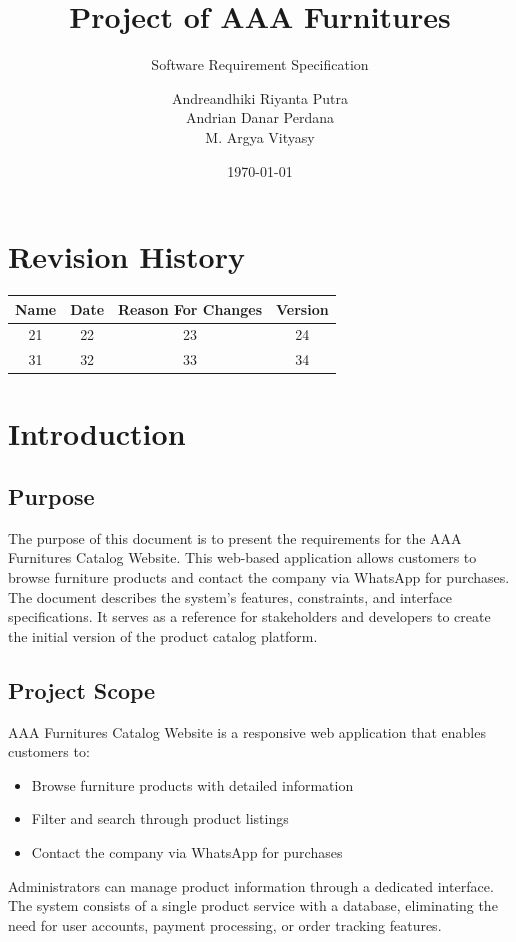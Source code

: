 \documentclass[oneside,a4paper,12pt,explicit]{book}
\title{Project of AAA Furnitures}
\subtitle{Software Requirement Specification}
\date{\today}
\author{Andreandhiki Riyanta Putra\\Andrian Danar Perdana\\M. Argya Vityasy}
\begin{document}
\maketitle
\large
\tableofcontents
\normalsize
\chapter*{Revision History}

\begin{center}
    \begin{tabular}{|c|c|c|c|}
        \hline
	    Name & Date & Reason For Changes & Version\\
        \hline
	    21 & 22 & 23 & 24\\
        \hline
	    31 & 32 & 33 & 34\\
        \hline
    \end{tabular}
\end{center}

\chapter{Introduction}

\section{Purpose}
The purpose of this document is to present the requirements for the AAA Furnitures Catalog Website. 
This web-based application allows customers to browse furniture products and contact the company 
via WhatsApp for purchases. The document describes the system's features, constraints, 
and interface specifications. It serves as a reference for stakeholders and developers 
to create the initial version of the product catalog platform.

\section{Project Scope}
AAA Furnitures Catalog Website is a responsive web application that enables customers to:
\begin{itemize}
    \item Browse furniture products with detailed information
    \item Filter and search through product listings
    \item Contact the company via WhatsApp for purchases
\end{itemize}
Administrators can manage product information through a dedicated interface. 
The system consists of a single product service with a database, eliminating the need 
for user accounts, payment processing, or order tracking features.
\end{document}
